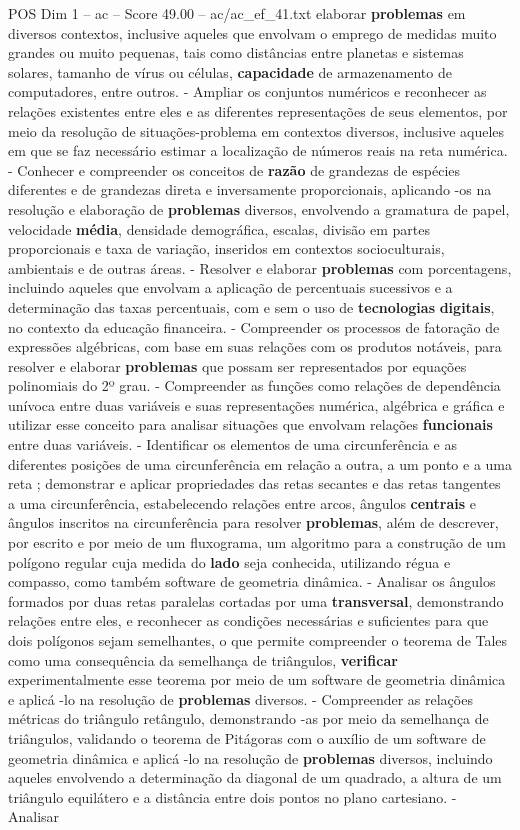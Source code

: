 \begin{textsample}{POS Dim 1 – ac – Score 49.00 – ac/ac\_ef\_41.txt}
elaborar \textbf{problemas} em diversos contextos, inclusive aqueles que envolvam o emprego de medidas muito grandes ou muito pequenas, tais como distâncias entre planetas e sistemas solares, tamanho de vírus ou células, \textbf{capacidade} de armazenamento de computadores, entre outros. - Ampliar os conjuntos numéricos e reconhecer as relações existentes entre eles e as diferentes representações de seus elementos, por meio da resolução de situações-problema em contextos diversos, inclusive aqueles em que se faz necessário estimar a localização de números reais na reta numérica. - Conhecer e compreender os conceitos de \textbf{razão} de grandezas de espécies diferentes e de grandezas direta e inversamente proporcionais, aplicando -os na resolução e elaboração de \textbf{problemas} diversos, envolvendo a gramatura de papel, velocidade \textbf{média}, densidade demográfica, escalas, divisão em partes proporcionais e taxa de variação, inseridos em contextos socioculturais, ambientais e de outras áreas. - Resolver e elaborar \textbf{problemas} com porcentagens, incluindo aqueles que envolvam a aplicação de percentuais sucessivos e a determinação das taxas percentuais, com e sem o uso de \textbf{tecnologias} \textbf{digitais}, no contexto da educação financeira. - Compreender os processos de fatoração de expressões algébricas, com base em suas relações com os produtos notáveis, para resolver e elaborar \textbf{problemas} que possam ser representados por equações polinomiais do 2º grau. - Compreender as funções como relações de dependência unívoca entre duas variáveis e suas representações numérica, algébrica e gráfica e utilizar esse conceito para analisar situações que envolvam relações \textbf{funcionais} entre duas variáveis. - Identificar os elementos de uma circunferência e as diferentes posições de uma circunferência em relação a outra, a um ponto e a uma reta ; demonstrar e aplicar propriedades das retas secantes e das retas tangentes a uma circunferência, estabelecendo relações entre arcos, ângulos \textbf{centrais} e ângulos inscritos na circunferência para resolver \textbf{problemas}, além de descrever, por escrito e por meio de um fluxograma, um algoritmo para a construção de um polígono regular cuja medida do \textbf{lado} seja conhecida, utilizando régua e compasso, como também software de geometria dinâmica. - Analisar os ângulos formados por duas retas paralelas cortadas por uma \textbf{transversal}, demonstrando relações entre eles, e reconhecer as condições necessárias e suficientes para que dois polígonos sejam semelhantes, o que permite compreender o teorema de Tales como uma consequência da semelhança de triângulos, \textbf{verificar} experimentalmente esse teorema por meio de um software de geometria dinâmica e aplicá -lo na resolução de \textbf{problemas} diversos. - Compreender as relações métricas do triângulo retângulo, demonstrando -as por meio da semelhança de triângulos, validando o teorema de Pitágoras com o auxílio de um software de geometria dinâmica e aplicá -lo na resolução de \textbf{problemas} diversos, incluindo aqueles envolvendo a determinação da diagonal de um quadrado, a altura de um triângulo equilátero e a distância entre dois pontos no plano cartesiano. - Analisar 
\end{textsample}

